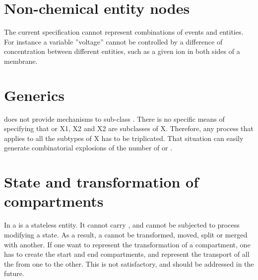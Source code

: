 \section{Non-chemical entity nodes}

The current specification cannot represent combinations of events and entities. For instance a variable ''voltage'' cannot be controlled by a difference of concentration between different entities, such as a given ion in both sides of a membrane. 

\section{Generics}

\SBGNPDLone does not provide mechanisms to sub-class . There is no specific means of specifying that  or  X1, X2 and X2 are subclasses of X. Therefore, any process that applies to all the subtypes of X has to be triplicated. That situation can easily generate combinatorial explosions of the number of  or .

\section{State and transformation of compartments}

In \SBGNPDLone a  is a stateless entity. It cannot carry  , and cannot be subjected to process modifying a state. As a result, a  cannot be transformed, moved, split or merged with another. If one want to represent the transformation of a compartment, one has to create the start and end compartments, and represent the transport of all the  from one to the other. This is not satisfactory, and should be addressed in the future.